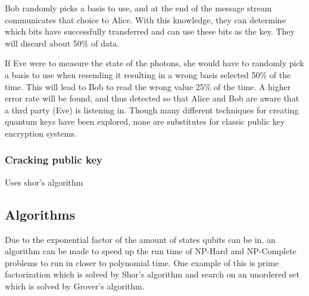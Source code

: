 \documentclass[12pt]{article}
\begin{document}
Bob randomly picks a basis to use, and at the end of the message stream communicates that choice to Alice. With this knowledge, they can determine which bits have successfully transferred and can use these bits as the key. They will discard about 50\% of data.\par
If Eve were to measure the state of the photons, she would have to randomly pick a basis to use when resending it resulting in a wrong basis selected 50\% of the time. This will lead to Bob to read the wrong value 25\% of the time. A higher error rate will be found, and thus detected so that Alice and Bob are aware that a thrd party (Eve) is listening in.
Though many different techniques for creating quantum keys have been explored, none are substitutes for classic public key encryption systems.
\subsubsection{Cracking public key}
Uses shor's algorithm
\subsection{Algorithms}
Due to the exponential factor of the amount of states qubits can be in, an algorithm can be made to speed up the run time of NP-Hard and NP-Complete problems to run in closer to polynomial time. One example of this is prime factorization which is solved by Shor's algorithm and search on an unordered set which is solved by Grover's algorithm.
\end{document}
